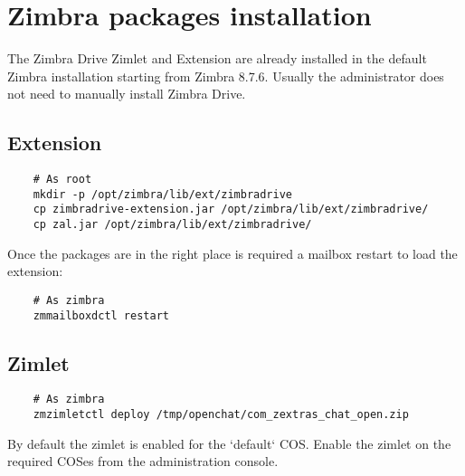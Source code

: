 \section{Zimbra packages installation}

\begin{warning}
    The Zimbra Drive Zimlet and Extension are already installed in the default Zimbra installation
    starting from Zimbra 8.7.6.
    Usually the administrator does not need to manually install Zimbra Drive.
\end{warning}

    \subsection{Extension}
    \begin{verbatim}
    # As root
    mkdir -p /opt/zimbra/lib/ext/zimbradrive
    cp zimbradrive-extension.jar /opt/zimbra/lib/ext/zimbradrive/
    cp zal.jar /opt/zimbra/lib/ext/zimbradrive/
    \end{verbatim}
    Once the packages are in the right place is required a mailbox restart to load the extension:
    \begin{verbatim}
    # As zimbra
    zmmailboxdctl restart
    \end{verbatim}

    \subsection{Zimlet}
    \begin{verbatim}
    # As zimbra
    zmzimletctl deploy /tmp/openchat/com_zextras_chat_open.zip
    \end{verbatim}
    By default the zimlet is enabled for the `default` COS.
    Enable the zimlet on the required COSes from the administration console.